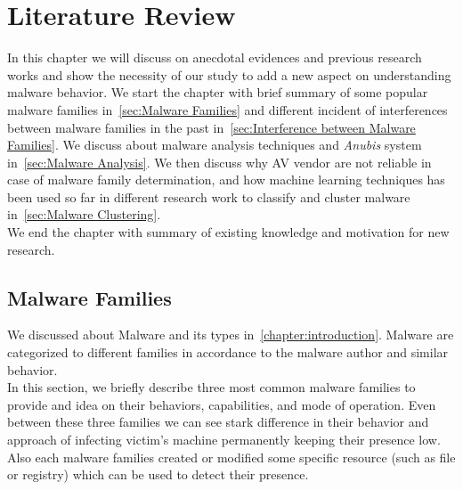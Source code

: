 \chapter{Literature Review}\label{chapter:literature_review}
In this chapter we will discuss on anecdotal evidences and previous research works and show the necessity of our study to add a new aspect on understanding malware behavior.
We start the chapter with brief summary of some popular malware families in~\autoref{sec:Malware Families} and different incident of interferences between malware families in the past in~\autoref{sec:Interference between Malware Families}.
We discuss about malware analysis techniques and \emph{Anubis} system in~\autoref{sec:Malware Analysis}.
We then discuss why AV vendor are not reliable in case of malware family determination, and how machine learning techniques has been used so far in different research work to classify and cluster malware in~\autoref{sec:Malware Clustering}.\\
We end the chapter with summary of existing knowledge and motivation for new research.
\section{Malware Families}
\label{sec:Malware Families}
We discussed about Malware and its types in~\autoref{chapter:introduction}.
Malware are categorized to different families in accordance to the malware author and similar behavior.\\
In this section, we briefly describe three most common malware families to provide and idea on their behaviors, capabilities, and mode of operation.
Even between these three families we can see stark difference in their behavior and approach of infecting victim's machine permanently keeping their presence low.
Also each malware families created or modified some specific resource (such as file or registry) which can be used to detect their presence.
